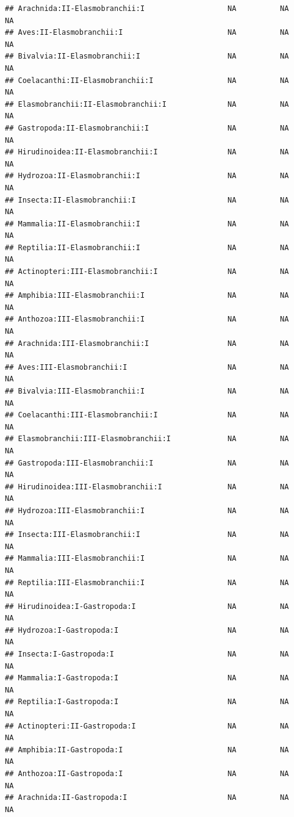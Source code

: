 \documentclass[
  12pt,
]{article}
\begin{document}
\begin{verbatim}
## Arachnida:II-Elasmobranchii:I                   NA          NA          NA
## Aves:II-Elasmobranchii:I                        NA          NA          NA
## Bivalvia:II-Elasmobranchii:I                    NA          NA          NA
## Coelacanthi:II-Elasmobranchii:I                 NA          NA          NA
## Elasmobranchii:II-Elasmobranchii:I              NA          NA          NA
## Gastropoda:II-Elasmobranchii:I                  NA          NA          NA
## Hirudinoidea:II-Elasmobranchii:I                NA          NA          NA
## Hydrozoa:II-Elasmobranchii:I                    NA          NA          NA
## Insecta:II-Elasmobranchii:I                     NA          NA          NA
## Mammalia:II-Elasmobranchii:I                    NA          NA          NA
## Reptilia:II-Elasmobranchii:I                    NA          NA          NA
## Actinopteri:III-Elasmobranchii:I                NA          NA          NA
## Amphibia:III-Elasmobranchii:I                   NA          NA          NA
## Anthozoa:III-Elasmobranchii:I                   NA          NA          NA
## Arachnida:III-Elasmobranchii:I                  NA          NA          NA
## Aves:III-Elasmobranchii:I                       NA          NA          NA
## Bivalvia:III-Elasmobranchii:I                   NA          NA          NA
## Coelacanthi:III-Elasmobranchii:I                NA          NA          NA
## Elasmobranchii:III-Elasmobranchii:I             NA          NA          NA
## Gastropoda:III-Elasmobranchii:I                 NA          NA          NA
## Hirudinoidea:III-Elasmobranchii:I               NA          NA          NA
## Hydrozoa:III-Elasmobranchii:I                   NA          NA          NA
## Insecta:III-Elasmobranchii:I                    NA          NA          NA
## Mammalia:III-Elasmobranchii:I                   NA          NA          NA
## Reptilia:III-Elasmobranchii:I                   NA          NA          NA
## Hirudinoidea:I-Gastropoda:I                     NA          NA          NA
## Hydrozoa:I-Gastropoda:I                         NA          NA          NA
## Insecta:I-Gastropoda:I                          NA          NA          NA
## Mammalia:I-Gastropoda:I                         NA          NA          NA
## Reptilia:I-Gastropoda:I                         NA          NA          NA
## Actinopteri:II-Gastropoda:I                     NA          NA          NA
## Amphibia:II-Gastropoda:I                        NA          NA          NA
## Anthozoa:II-Gastropoda:I                        NA          NA          NA
## Arachnida:II-Gastropoda:I                       NA          NA          NA

\end{verbatim}
\end{document}
